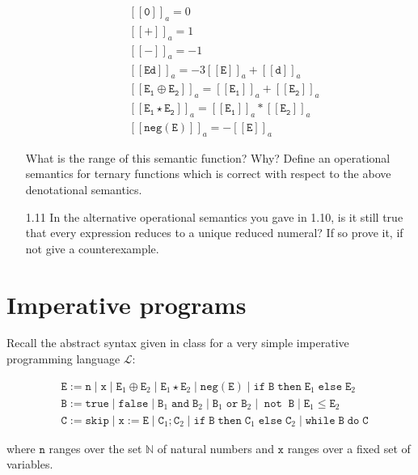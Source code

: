 \documentclass[a4paper,10pt]{article}
\newcommand{\E}{\mathtt{E}}
\newcommand{\B}{\mathtt{B}}
\newcommand{\C}{\mathtt{C}}
\newcommand{\true}{\mathtt{true}}
\newcommand{\false}{\mathtt{false}}
\newcommand{\andsym}{\mathtt{and}}
\newcommand{\orsym}{\mathtt{or}}
\newcommand{\notsym}{\mathop{\mathtt{not}}}
\newcommand{\ifsym}{\mathtt{if}}
\newcommand{\then}{\mathtt{then}}
\newcommand{\elsesym}{\mathtt{else}}
\newcommand{\whilesym}{\mathtt{while}}
\newcommand{\dosym}{\mathtt{do}}
\newcommand{\skipsym}{\mathtt{skip}}
\newcommand{\digit}{\mathtt{d}}
\newcommand{\negation}{\mathtt{neg}}
\newcommand{\denot}[1]{\mathtt{[[{#1}]]}}
\newcommand{\question}[1]
{\color{DarkBlue}#1 \color{Black} \newline}
\begin{document}
\begin{enumerate}
{\begin{align*}
& \denot{\mathtt{0}}_a = 0 \\ & \denot{\mathtt{+}}_a = 1 \\ & \denot{\mathtt{-}}_a = -1 \\
& \denot{\E \digit}_a = -3\denot{E}_a + \denot{\digit}_a \\
& \denot{\E_1 \oplus \E_2}_a = \denot{\E_1}_a + \denot{\E_2}_a \\
& \denot{\E_1 \star \E_2}_a = \denot{\E_1}_a * \denot{\E_2}_a \\
& \denot{\negation(\E)}_a = -\denot{\E}_a
\end{align*}

What is the range of this semantic function? Why? Define an operational semantics for 
ternary functions which is correct with respect to the above denotational semantics.
}

\question{
\item[1.11] In the alternative operational semantics you gave in 1.10, is it still true that every expression reduces to a 
unique reduced numeral? If so prove it, if not give a counterexample. 
}

\end{enumerate}



\section{Imperative programs}

\question{
Recall the abstract syntax given in class for a very simple imperative programming language $\mathcal{L}$:

\begin{align*}
& \E := \mathtt{n} \; | \; \mathtt{x} \; | \; \E_1 \oplus \E_2 \; | \; \E_1 \star \E_2 \; | \; \negation(\E) \; | \; \ifsym \; \B \; \then \; \E_1 \; \elsesym \; \E_2 \\ 
& \B := \true \; | \; \false \; | \; \B_1 \; \andsym \; \B_2 \; | \; \B_1 \; \orsym \; \B_2 \; | \; \notsym \; \B \; | \; \E_1 \leq \E_2 \\
& \C := \skipsym \; | \; \mathtt{x} := \E \; | \; \C_1 ; \C_2 \; | \; \ifsym \; \B \; \then \; \C_1 \; \elsesym \; \C_2 \; | \; \whilesym \; \B \; \dosym \; \C
\end{align*}

where $\mathtt{n}$ ranges over the set $\mathbb{N}$ of natural numbers and $\mathtt{x}$ 
ranges over a fixed set of variables.
}
\end{document}
